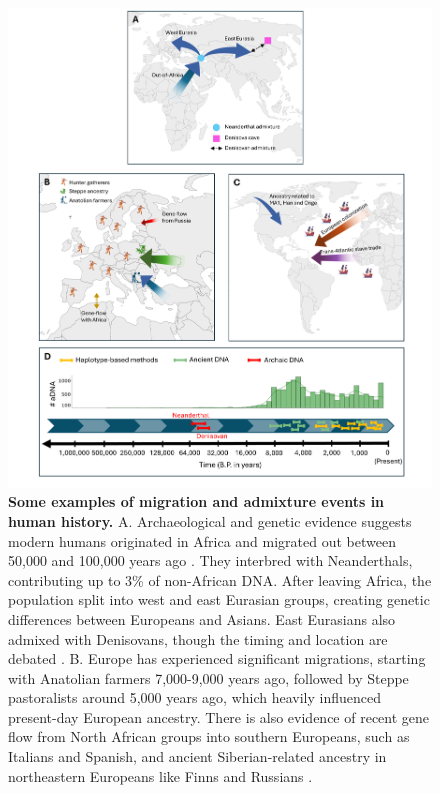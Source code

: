 \begin{figure}[h!]
    \centering
    \includegraphics[width=\textwidth]{figures/thesis_gb_migration_example_v2.png}
    \captionsetup{width=\textwidth+3cm}
    \caption{
    \footnotesize
    \textbf{Some examples of migration and admixture events in human history.} A. Archaeological and genetic evidence suggests modern humans originated in Africa and migrated out between 50,000 and 100,000 years ago \cite{darwin1874descent, lopez2015human}. They interbred with Neanderthals, contributing up to 3\% of non-African DNA. After leaving Africa, the population split into west and east Eurasian groups, creating genetic differences between Europeans and Asians. East Eurasians also admixed with Denisovans, though the timing and location are debated \cite{jacobs2019multiple, reich2010genetic}.
    B. Europe has experienced significant migrations, starting with Anatolian farmers 7,000-9,000 years ago, followed by Steppe pastoralists around 5,000 years ago, which heavily influenced present-day European ancestry. There is also evidence of recent gene flow from North African groups into southern Europeans, such as Italians and Spanish, and ancient Siberian-related ancestry in northeastern Europeans like Finns and Russians \cite{haak2015massive, salter2019fine}.
}
\end{figure}
